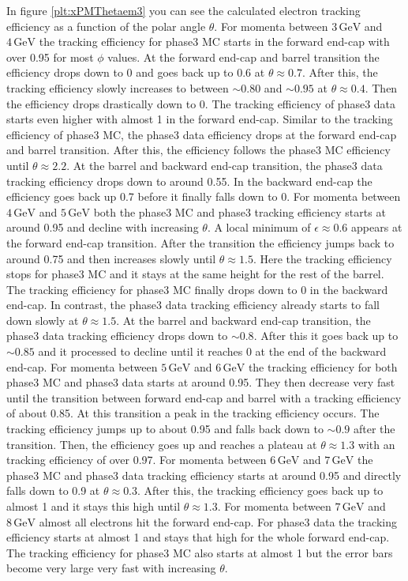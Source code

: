 \documentclass[a4paper,11pt,twosided,final,german,openbib,pdftex,listof=totoc,bibliography=totoc]{scrbook}
\begin{document}
In figure \ref{plt:xPMThetaem3} you can see the calculated electron tracking efficiency as a function of the polar angle $\theta$.
For momenta between $3\,\textrm{GeV}$ and $4\,\textrm{GeV}$ the tracking efficiency for phase3 MC starts in the forward end-cap with over 0.95 for most $\phi$ values. At the forward end-cap and barrel transition the efficiency drops down to 0 and goes back up to 0.6 at $\theta \approx 0.7$. After this, the tracking efficiency slowly increases to between $\sim 0.80$ and $\sim 0.95$ at $\theta \approx 0.4$. Then the efficiency drops drastically down to 0. The tracking efficiency of phase3 data starts even higher with almost 1 in the forward end-cap. Similar to the tracking efficiency of phase3 MC, the phase3 data efficiency drops at the forward end-cap and barrel transition. After this, the efficiency follows the phase3 MC efficiency until $\theta \approx 2.2$. At the barrel and backward end-cap transition, the phase3 data tracking efficiency drops down to around 0.55. In the backward end-cap the efficiency goes back up 0.7 before it finally falls down to 0.
For momenta between $4\,\textrm{GeV}$ and $5\,\textrm{GeV}$ both the phase3 MC and phase3 tracking efficiency starts at around 0.95 and decline with increasing $\theta$. A local minimum of $\epsilon \approx 0.6$ appears at the forward end-cap transition. After the transition the efficiency jumps back to around 0.75 and then increases slowly until $\theta \approx 1.5$. Here the tracking efficiency stops for phase3 MC and it stays at the same height for the rest of the barrel. The tracking efficiency for phase3 MC finally drops down to 0 in the backward end-cap. In contrast, the phase3 data tracking efficiency already starts to fall down slowly at $\theta \approx 1.5$. At the barrel and backward end-cap transition, the phase3 data tracking efficiency drops down to $\sim0.8$. After this it goes back up to $\sim0.85$ and it processed to decline until it reaches 0 at the end of the backward end-cap.
For momenta between $5\,\textrm{GeV}$ and $6\,\textrm{GeV}$ the tracking efficiency for both phase3 MC and phase3 data starts at around 0.95. They then decrease very fast until the transition between forward end-cap and barrel with a tracking efficiency of about 0.85. At this transition a peak in the tracking efficiency occurs. The tracking efficiency jumps up to about 0.95 and falls back down to $\sim 0.9$ after the transition. Then, the efficiency goes up and reaches a plateau at $\theta \approx 1.3$ with an tracking efficiency of over 0.97.
For momenta between $6\,\textrm{GeV}$ and $7\,\textrm{GeV}$ the phase3 MC and phase3 data tracking efficiency starts at around 0.95 and directly falls down to 0.9 at $\theta \approx 0.3$. After this, the tracking efficiency goes back up to almost 1 and it stays this high until $\theta \approx 1.3$.
For momenta between $7\,\textrm{GeV}$ and $8\,\textrm{GeV}$ almost all electrons hit the forward end-cap. For phase3 data the tracking efficiency starts at almost 1 and stays that high for the whole forward end-cap. The tracking efficiency for phase3 MC also starts at almost 1 but the error bars become very large very fast with increasing $\theta$.
\end{document}
